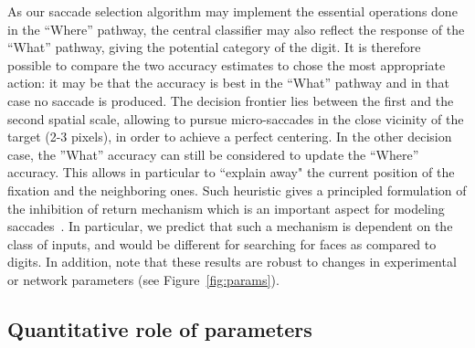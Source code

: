 As our saccade selection algorithm may implement the essential operations done in the ``Where'' pathway, the central classifier may also reflect the response of the ``What'' pathway,
giving the potential category of the digit. %
It is therefore possible to compare the two accuracy estimates to chose the most appropriate action: it may be that the accuracy is best in the ``What'' pathway and in that case no saccade is produced.
The decision frontier lies between the first and the second spatial scale, allowing to pursue micro-saccades in the close vicinity of the target (2-3 pixels), in order to achieve a perfect centering.
In the other decision case, the ''What'' accuracy can still be considered to update the ``Where'' accuracy.
This allows in particular to ``explain away" the current position of the fixation and the neighboring ones.
Such heuristic gives a principled formulation of the inhibition of return mechanism which is an important aspect for modeling saccades~\citep{Itti01}. In particular, we predict that such a mechanism is dependent on the class of inputs, and would be different for searching for faces as compared to digits.
In addition, note that these results are robust to changes in experimental or network parameters (see Figure~\ref{fig:params}).
\ICANN
{\color{blue}\subsection{Quantitative role of parameters}}
\fi
